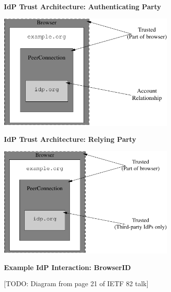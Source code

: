 \documentclass[helvetica]{seminar}
\newcommand{\heading}[1]{%
  \begin{center} 
    \large\bf 
    #1 
  \end{center} 
  \vspace{.4 in}}
\begin{document}
\begin{slide}
\heading{IdP Trust Architecture: Authenticating Party}

\begin{center}
\includegraphics[width=3.5in]{rtcweb-security-arch-idp}
\end{center}

\end{slide}

\begin{slide}
\heading{IdP Trust Architecture: Relying Party}

\begin{center}
\includegraphics[width=3.5in]{rtcweb-security-arch-idp2}
\end{center}
\end{slide}



\begin{slide}
\heading{Example IdP Interaction: BrowserID}

[TODO: Diagram from page 21 of IETF 82 talk]

\end{slide}
\end{document}

